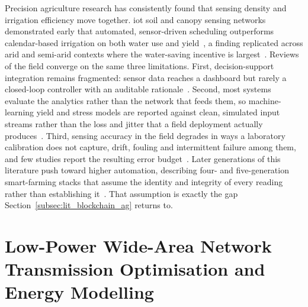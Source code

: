 \documentclass[12pt,a4paper,oneside]{book}
\begin{document}
Precision agriculture research has consistently found that sensing density
and irrigation efficiency move together. \gls{iot} soil and canopy sensing
networks demonstrated early that automated, sensor-driven scheduling
outperforms calendar-based irrigation on both water use and
yield~\cite{rathi2025smart, brooks2019precisionWater, chatterjee2023precision, gondchawar2016agriculture4}, a finding replicated across arid and
semi-arid contexts where the water-saving incentive is
largest~\cite{williams2022savings, miller2020climateImpact, garrido2018mediterranean}. Reviews of the field converge on the same three
limitations. First, decision-support integration remains
fragmented: sensor data reaches a dashboard but rarely a closed-loop
controller with an auditable
rationale~\cite{aydin2021comprehensive, zhang2002precision, gebbers2010precision, mcbratney2005future}. Second, most systems evaluate
the analytics rather than the network that feeds them, so machine-learning
yield and stress models are reported against clean, simulated input streams
rather than the loss and jitter that a field deployment actually
produces~\cite{chlingaryan2018machine, goap2018iot, mohanty2016using, van2020review}. Third, sensing accuracy in the field degrades in ways a
laboratory calibration does not capture, drift, fouling and intermittent
failure among them, and few studies report the resulting error
budget~\cite{akhtar2019sensingAccuracy, agri2024sensorAccuracy, garcia2021sensorFailures, lopez2023remoteFailure}. Later generations of this
literature push toward higher automation, describing four- and
five-generation smart-farming stacks that assume the identity and integrity
of every reading rather than establishing
it~\cite{suleiman2025agriculture5, owusu2025iotAgri, yang2021iotSensing, singh2019iotSmartIrrigation, jin2025productivity}. That assumption is exactly
the gap Section~\ref{subsec:lit_blockchain_ag} returns to.

\section{Low-Power Wide-Area Network Transmission Optimisation and Energy
Modelling}
\label{subsec:lit_lpwan}
\end{document}
